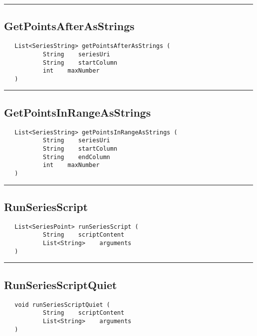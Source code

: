 \rule{15cm}{2pt}
\subsection{GetPointsAfterAsStrings}
\label{Api:GetPointsAfterAsStrings}
\begin{verbatim}
   List<SeriesString> getPointsAfterAsStrings (
           String    seriesUri
           String    startColumn
           int    maxNumber
   )
\end{verbatim}



\rule{15cm}{2pt}
\subsection{GetPointsInRangeAsStrings}
\label{Api:GetPointsInRangeAsStrings}
\begin{verbatim}
   List<SeriesString> getPointsInRangeAsStrings (
           String    seriesUri
           String    startColumn
           String    endColumn
           int    maxNumber
   )
\end{verbatim}



\rule{15cm}{2pt}
\subsection{RunSeriesScript}
\label{Api:RunSeriesScript}
\begin{verbatim}
   List<SeriesPoint> runSeriesScript (
           String    scriptContent
           List<String>    arguments
   )
\end{verbatim}



\rule{15cm}{2pt}
\subsection{RunSeriesScriptQuiet}
\label{Api:RunSeriesScriptQuiet}
\begin{verbatim}
   void runSeriesScriptQuiet (
           String    scriptContent
           List<String>    arguments
   )
\end{verbatim}



